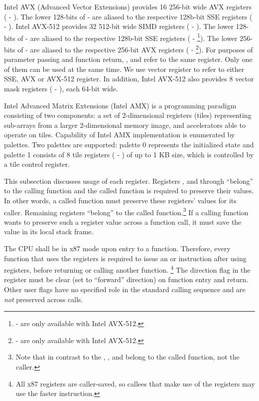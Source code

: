 Intel AVX (Advanced Vector Extensions) provides 16 256-bit wide AVX registers
( - ).  The lower 128-bits of  - 
are aliased to the respective 128b-bit SSE registers ( -
).  Intel AVX-512 provides 32 512-bit wide SIMD registers
( - ).  The lower 128-bits of  - 
are aliased to the respective 128b-bit SSE registers
( - \footnote{ - 
are only available with Intel AVX-512.}).
The lower 256-bits of  - 
are aliased to the respective 256-bit AVX registers
( - \footnote{ - 
are only available with Intel AVX-512.}).
For purposes of parameter passing
and function return, ,  and  refer to the
same register. Only one of them can be used at the same time.  We use
vector register to refer to either SSE, AVX or AVX-512 register.  In
addition, Intel AVX-512 also provides 8 vector mask registers (
- ), each 64-bit wide.

Intel Advanced Matrix Extensions (Intel AMX) is a programming
paradigm consisting of two components: a set of 2-dimensional registers
(tiles) representing sub-arrays from a larger 2-dimensional memory image,
and accelerators able to operate on tiles.  Capability of Intel AMX
implementation is enumerated by palettes.  Two palettes are supported:
palette 0 represents the initialized state and palette 1 consists of
8 tile registers ( - ) of up to 1 KB size, which
is controlled by a tile control register.

This subsection discusses usage of each register.  Registers \RBP, \RBX and
 through  ``belong'' to the calling function and the
called function is required to preserve their values.  In other words,
a called function must preserve these registers' values for its
caller.  Remaining registers ``belong'' to the called
function.\footnote{Note that in contrast to the \intelabi, \RDI,
  and \RSI belong to the called function, not the caller.}  If a
calling function wants to preserve such a register value across a
function call, it must save the value in its local stack frame.

The CPU shall be in x87 mode upon entry to a function.  Therefore,
every function that uses the \MMX registers is required to issue an
 or  instruction after using \MMX registers, before
returning or calling another function.  \footnote{All x87 registers
are caller-saved, so callees that make use of the \MMX registers may
use the faster  instruction.}  The direction flag  in the
 register must be clear (set to ``forward'' direction) on function
entry and return.  Other user flags have no specified role in the
standard calling sequence and are {\em not} preserved across calls.

